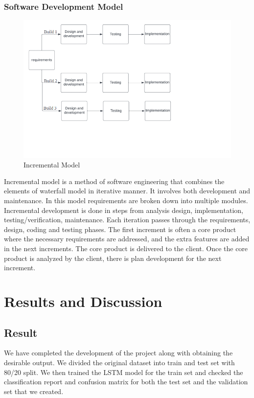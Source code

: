 \subsection{Software Development Model}
\vspace{-18pt}
 \begin{figure}[tbh] %
\begin{center}
	\includegraphics[width=6in]{images/sdlc1.png} 
	\caption{Incremental Model} %
	\label{Incremental Model} %
\end{center}
\end{figure}
Incremental model is a method of software engineering that combines the elements of waterfall model in iterative manner. It involves both development and maintenance. In this model requirements are broken down into multiple modules. Incremental development is done in steps from analysis design, implementation, testing/verification, maintenance. Each iteration passes through the requirements, design, coding and testing phases. The first increment is often a core product where the necessary requirements are addressed, and the extra features are added in the next increments. The core product is delivered to the client. Once the core product is analyzed by the client, there is plan development for the next increment.
\chapter{Results and Discussion}
\vspace{-18pt}
\section{Result}
\vspace{-18pt}
We have completed the development of the project along with obtaining the desirable output. We divided the original dataset into train and test set with 80/20 split. We then trained the LSTM model for the train set and checked the classification report and confusion matrix for both the test set and the validation set that we created.

